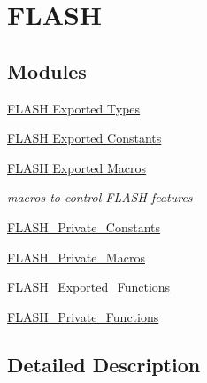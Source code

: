 \hypertarget{group___f_l_a_s_h}{\section{F\-L\-A\-S\-H}
\label{group___f_l_a_s_h}
}
\subsection*{Modules}
\begin{DoxyCompactItemize}
\item 
\hyperlink{group___f_l_a_s_h___exported___types}{F\-L\-A\-S\-H Exported Types}
\item 
\hyperlink{group___f_l_a_s_h___exported___constants}{F\-L\-A\-S\-H Exported Constants}
\item 
\hyperlink{group___f_l_a_s_h___exported___macros}{F\-L\-A\-S\-H Exported Macros}
\begin{DoxyCompactList}\small\item\em macros to control F\-L\-A\-S\-H features \end{DoxyCompactList}\item 
\hyperlink{group___f_l_a_s_h___private___constants}{F\-L\-A\-S\-H\-\_\-\-Private\-\_\-\-Constants}
\item 
\hyperlink{group___f_l_a_s_h___private___macros}{F\-L\-A\-S\-H\-\_\-\-Private\-\_\-\-Macros}
\item 
\hyperlink{group___f_l_a_s_h___exported___functions}{F\-L\-A\-S\-H\-\_\-\-Exported\-\_\-\-Functions}
\item 
\hyperlink{group___f_l_a_s_h___private___functions}{F\-L\-A\-S\-H\-\_\-\-Private\-\_\-\-Functions}
\end{DoxyCompactItemize}


\subsection{Detailed Description}

